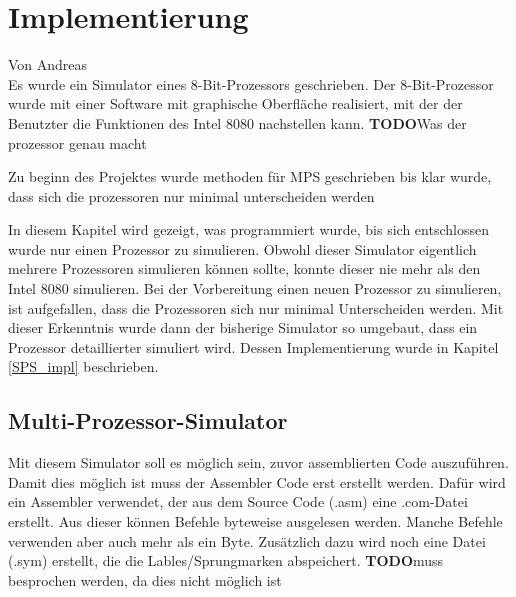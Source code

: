 \documentclass[12pt]{article}
\newcommand{\todo}{\textbf{TODO}}
\begin{document}
\newpage

\section{Implementierung}
Von Andreas\\

\noindent
Es wurde ein Simulator eines 8-Bit-Prozessors geschrieben.
Der 8-Bit-Prozessor wurde mit einer Software mit graphische Oberfläche realisiert, mit der der Benutzter die Funktionen des Intel 8080 nachstellen kann.
\todo Was der prozessor genau macht 

Zu beginn des Projektes wurde methoden für MPS geschrieben bis klar wurde, dass sich die prozessoren nur minimal unterscheiden werden


In diesem Kapitel wird gezeigt, was programmiert wurde, bis sich entschlossen wurde nur einen Prozessor zu simulieren. Obwohl dieser Simulator eigentlich mehrere Prozessoren simulieren können sollte, konnte dieser nie mehr als den Intel 8080 simulieren. Bei der Vorbereitung einen neuen Prozessor zu simulieren, ist aufgefallen, dass die Prozessoren sich nur minimal Unterscheiden werden. Mit dieser Erkenntnis wurde dann der bisherige Simulator so umgebaut, dass ein Prozessor detaillierter simuliert wird. Dessen Implementierung wurde in Kapitel \ref{SPS_impl} beschrieben.


\subsection{Multi-Prozessor-Simulator}
Mit diesem Simulator soll es möglich sein, zuvor assemblierten Code auszuführen. Damit dies möglich ist muss der Assembler Code erst erstellt werden. Dafür wird ein Assembler verwendet, der aus dem Source Code (.asm) eine .com-Datei erstellt. Aus dieser können Befehle byteweise ausgelesen werden. Manche Befehle verwenden aber auch mehr als ein Byte. Zusätzlich dazu wird noch eine Datei (.sym) erstellt, die die Lables/Sprungmarken abspeichert.
\todo muss besprochen werden, da dies nicht möglich ist
\end{document}
